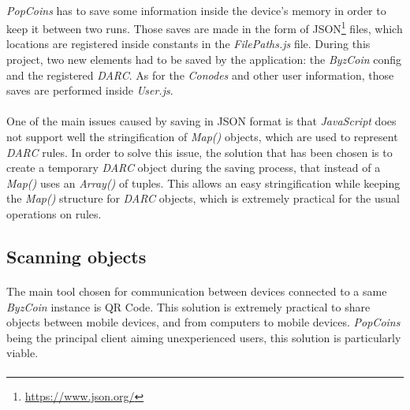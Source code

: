 \paragraph{}

\textit{PopCoins} has to save some information inside the device's memory in order to keep it between two runs. Those saves are made in the form of JSON\footnote{\url{https://www.json.org/}} files, which locations are registered inside constants in the \textit{FilePaths.js} file. During this project, two new elements had to be saved by the application: the \textit{ByzCoin} config and the registered \textit{DARC}. As for the \textit{Conodes} and other user information, those saves are performed inside \textit{User.js}.

\paragraph{}

One of the main issues caused by saving in JSON format is that \textit{JavaScript} does not support well the stringification of \textit{Map()} objects, which are used to represent \textit{DARC} rules. In order to solve this issue, the solution that has been chosen is to create a temporary \textit{DARC} object during the saving process, that instead of a \textit{Map()} uses an \textit{Array()} of tuples. This allows an easy stringification while keeping the \textit{Map()} structure for \textit{DARC} objects, which is extremely practical for the usual operations on rules.

\subsection{Scanning objects}
\label{subsection53}

\paragraph{}

The main tool chosen for communication between devices connected to a same \textit{ByzCoin} instance is QR Code. This solution is extremely practical to share objects between mobile devices, and from computers to mobile devices. \textit{PopCoins} being the principal client aiming unexperienced users, this solution is particularly viable.

\paragraph{}

